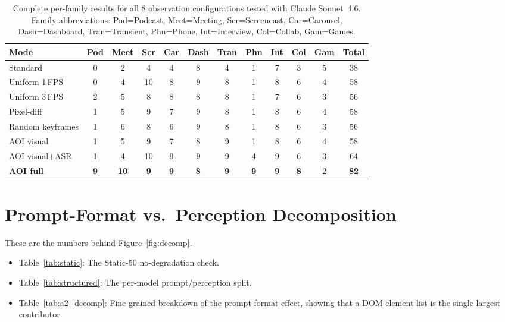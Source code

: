 \documentclass[11pt]{article}
\begin{document}
\begin{table}[!h]
\centering
\caption{Complete per-family results for all 8 observation configurations tested
with Claude Sonnet~4.6. Family abbreviations: Pod=Podcast, Meet=Meeting,
Scr=Screencast, Car=Carousel, Dash=Dashboard, Tran=Transient, Phn=Phone,
Int=Interview, Col=Collab, Gam=Games.}
\label{tab:fullablation}
\small
\setlength{\tabcolsep}{3pt}
\begin{tabular}{@{}l cccccccccc c@{}}
\toprule
\textbf{Mode} & Pod & Meet & Scr & Car & Dash & Tran & Phn & Int & Col & Gam & \textbf{Total} \\
\midrule
Standard & 0 & 2 & 4 & 4 & 8 & 4 & 1 & 7 & 3 & 5 & 38 \\
Uniform 1\,FPS & 0 & 4 & 10 & 8 & 9 & 8 & 1 & 8 & 6 & 4 & 58 \\
Uniform 3\,FPS & 2 & 5 & 8 & 8 & 8 & 8 & 1 & 7 & 6 & 3 & 56 \\
Pixel-diff & 1 & 5 & 9 & 7 & 9 & 8 & 1 & 8 & 6 & 4 & 58 \\
Random keyframes & 1 & 6 & 8 & 6 & 9 & 8 & 1 & 8 & 6 & 3 & 56 \\
AOI visual & 1 & 5 & 9 & 7 & 8 & 9 & 1 & 8 & 6 & 4 & 58 \\
AOI visual+ASR & 1 & 4 & 10 & 9 & 9 & 9 & 4 & 9 & 6 & 3 & 64 \\
\textbf{AOI full} & \textbf{9} & \textbf{10} & \textbf{9} & \textbf{9} & \textbf{8} & \textbf{9} & \textbf{9} & \textbf{9} & \textbf{8} & 2 & \textbf{82} \\
\bottomrule
\end{tabular}
\end{table}

\section{Prompt-Format vs.\ Perception Decomposition}
\label{app:promptdecomp}

These are the numbers behind Figure~\ref{fig:decomp}.
\begin{itemize}
  \item Table~\ref{tab:static}: The Static-50 no-degradation check.
  \item Table~\ref{tab:structured}: The per-model prompt/perception split.
  \item Table~\ref{tab:a2_decomp}: Fine-grained breakdown of the prompt-format effect, showing that a DOM-element
list is the single largest contributor.
\end{itemize}
\end{document}
